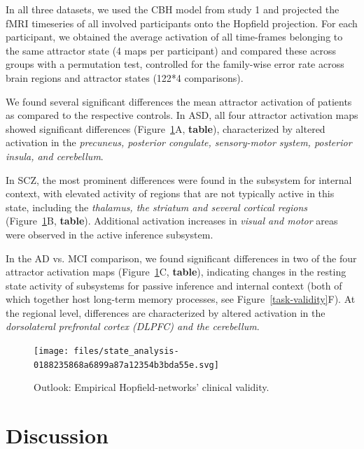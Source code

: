 \documentclass{article}
\begin{document}
In all three datasets, we used the CBH model from study 1 and projected the fMRI timeseries of all involved participants onto the Hopfield projection. For each participant, we obtained the average activation of all time-frames belonging to the same attractor state (4 maps per participant) and compared these across groups with a permutation test, controlled for the family-wise error rate across brain regions and attractor states (122*4 comparisons).

We found several significant differences the mean attractor activation of patients as compared to the respective controls. In ASD, all four attractor activation maps showed significant differences (Figure~\ref{clinical-validity}A, \textbf{table}), characterized by altered activation in the \textit{precuneus, posterior congulate, sensory-motor system, posterior insula, and cerebellum}.

In SCZ, the most prominent differences were found in the subsystem for internal context, with elevated activity of regions that are not typically active in this state, including the \textit{thalamus, the striatum and several cortical regions} (Figure~\ref{clinical-validity}B, \textbf{table}). Additional activation increases in \textit{visual and motor} areas were observed in the active inference subsystem.

In the AD vs. MCI comparison, we found significant differences in two of the four attractor activation maps (Figure~\ref{clinical-validity}C, \textbf{table}), indicating changes in the resting state activity of subsystems for passive inference and internal context (both of which together host long-term memory processes, see Figure~\ref{task-validity}F). At the regional level, differences are characterized by altered activation in the \textit{dorsolateral prefrontal cortex (DLPFC) and the cerebellum}.

\begin{figure}[!htbp]
\centering
\texttt{[image: files/state\_analysis-0188235868a6899a87a12354b3bda55e.svg]}
\caption[]{Outlook: Empirical Hopfield-networks' clinical validity.}
\label{clinical-validity}
\end{figure}

\section{Discussion}\label{Discussion}
\end{document}
